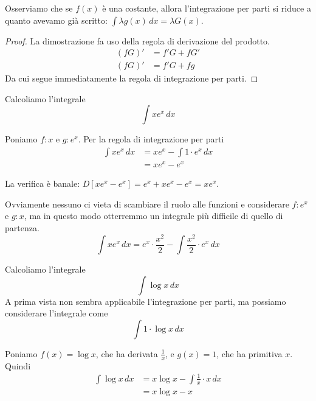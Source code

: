 Osserviamo che se $f(x)$ è una costante, allora l'integrazione per parti si riduce a quanto avevamo già scritto: $\int \lambda g(x) \, dx = \lambda G(x)$.

\begin{proof}
La dimostrazione fa uso della regola di derivazione del prodotto.
\begin{align*}
(fG)' &= f'G + fG' \\
(fG)' &= f'G + fg
\end{align*}
Da cui segue immediatamente la regola di integrazione per parti.
\end{proof}

\begin{example}
Calcoliamo l'integrale
\begin{equation*}
\int x e^x \, dx
\end{equation*}

Poniamo $f:x$ e $g: e^x$. Per la regola di integrazione per parti
\begin{align*}
\int x e^x \, dx &= xe^x - \int 1 \cdot e^x \, dx \\
&= xe^x - e^x
\end{align*}

La verifica è banale: $D[xe^x - e^x] = e^x + xe^x - e^x = xe^x$.

Ovviamente nessuno ci vieta di scambiare il ruolo alle funzioni e considerare $f: e^x$ e $g: x$, ma in questo modo otterremmo un integrale più
difficile di quello di partenza.
\begin{equation*}
\int x e^x \, dx = e^x \cdot \frac{x^2}{2} - \int \frac{x^2}{2} \cdot e^x \, dx 
\end{equation*}
\end{example}

\begin{example}
Calcoliamo l'integrale
\begin{equation*}
\int \log x \, dx
\end{equation*}
A prima vista non sembra applicabile l'integrazione per parti, ma possiamo considerare l'integrale come
\begin{equation*}
\int 1 \cdot \log x \, dx
\end{equation*}

Poniamo $f(x) = \log x$, che ha derivata $\frac{1}{x}$, e $g(x) = 1$, che ha primitiva $x$. Quindi
\begin{align*}
\int \log x \, dx &= x\log x - \int \frac{1}{x} \cdot x \, dx \\
&= x\log x - x
\end{align*}
\end{example}

